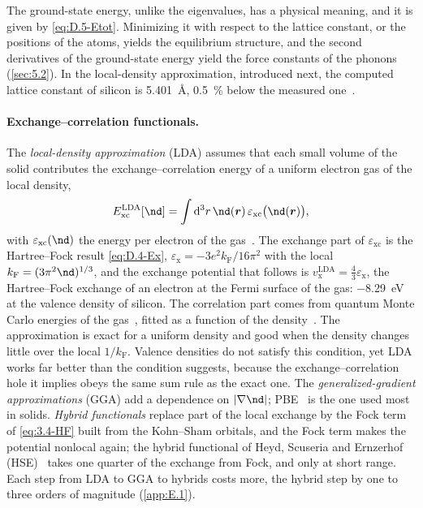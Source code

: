 The ground-state energy, unlike the eigenvalues, has a physical meaning, and it is given by \cref{eq:D.5-Etot}. Minimizing it with respect to the lattice constant, or the positions of the atoms, yields the equilibrium structure, and the second derivatives of the ground-state energy yield the force constants of the phonons (\cref{sec:5.2}). In the local-density approximation, introduced next, the computed lattice constant of silicon is \SI{5.401}{\angstrom}, \SI{0.5}{\percent} below the measured one~\cite[Sect.~10.2]{ponce2016epw}.

\paragraph{Exchange--correlation functionals.}
The \emph{local-density approximation} (LDA) assumes that each small volume of the solid contributes the exchange--correlation energy of a uniform electron gas of the local density,
\begin{equation}
  E_{\mathrm{xc}}^{\mathrm{LDA}}[\nd] = \int\dd^3r\,\nd(\vect{r})\,\varepsilon_{\mathrm{xc}}\bigl(\nd(\vect{r})\bigr) ,
  \label{eq:3.4-LDA}
\end{equation}
with $\varepsilon_{\mathrm{xc}}(\nd)$ the energy per electron of the gas~\cite{kohn1965self}. The exchange part of $\varepsilon_{\mathrm{xc}}$ is the Hartree--Fock result \cref{eq:D.4-Ex}, $\varepsilon_{\mathrm{x}} = -3e^2k_{\mathrm{F}}/16\pi^2$ with the local $k_{\mathrm{F}} = (3\pi^2\nd)^{1/3}$, and the exchange potential that follows is $v_{\mathrm{x}}^{\mathrm{LDA}} = \tfrac43\varepsilon_{\mathrm{x}}$, the Hartree--Fock exchange of an electron at the Fermi surface of the gas: \SI{-8.29}{eV} at the valence density of silicon. The correlation part comes from quantum Monte Carlo energies of the gas~\cite{ceperley1980ground}, fitted as a function of the density~\cite{perdew1981self}. The approximation is exact for a uniform density and good when the density changes little over the local $1/k_{\mathrm{F}}$. Valence densities do not satisfy this condition, yet LDA works far better than the condition suggests, because the exchange--correlation hole it implies obeys the same sum rule as the exact one. The \emph{generalized-gradient approximations} (GGA) add a dependence on $|\nabla\nd|$; PBE~\cite{perdew1996generalized} is the one used most in solids. \emph{Hybrid functionals} replace part of the local exchange by the Fock term of \cref{eq:3.4-HF} built from the Kohn--Sham orbitals, and the Fock term makes the potential nonlocal again; the hybrid functional of Heyd, Scuseria and Ernzerhof (HSE)~\cite{heyd2003hybrid} takes one quarter of the exchange from Fock, and only at short range. Each step from LDA to GGA to hybrids costs more, the hybrid step by one to three orders of magnitude (\cref{app:E.1}).

